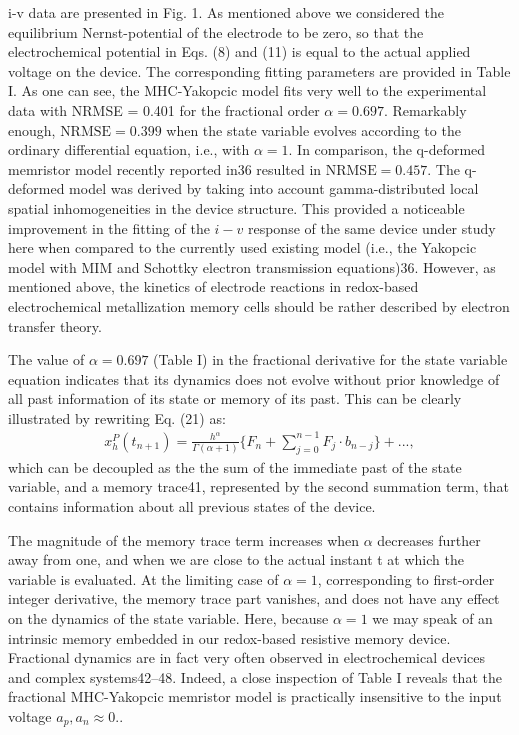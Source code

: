 \documentclass{article}
\begin{document}
{\begin{multicols}{2}
{i-v data are presented in Fig. 1. As mentioned above
we considered the equilibrium Nernst-potential of the
electrode to be zero, so that the electrochemical potential in Eqs. (8) and (11) is equal to the actual applied
voltage on the device. The corresponding fitting parameters are provided in Table I. As one can see, the
MHC-Yakopcic model fits very well to the experimental data with NRMSE = 0.401 for the fractional order
$\alpha = 0.697$. Remarkably enough, $\text{NRMSE} = 0.399$ when
the state variable evolves according to the ordinary differential equation, i.e., with $\alpha = 1$. In comparison, the
q-deformed memristor model recently reported in36 resulted in $\text{NRMSE} = 0.457$. The q-deformed model was
derived by taking into account gamma-distributed local
spatial inhomogeneities in the device structure. This provided a noticeable improvement in the fitting of the $i-v$ response of the same device under study here when
compared to the currently used existing model (i.e., the
Yakopcic model with MIM and Schottky electron transmission equations)36. However, as mentioned above,
the kinetics of electrode reactions in redox-based electrochemical metallization memory cells should be rather described by electron transfer theory. \par
The value of $\alpha = 0.697$ (Table I) in the fractional
derivative for the state variable equation indicates that
its dynamics does not evolve without prior knowledge of
all past information of its state or memory of its past.
This can be clearly illustrated by rewriting Eq. (21) as:
\begin{align}
   x_h^P (t_{n+1}) = \frac{h^\alpha}{\Gamma (\alpha + 1)} \biggl\{ F_n + \sum_{j=0}^{n-1} F_j \cdot b_{n-j} \biggr\} + ...,
\end{align}
which can be decoupled as the the sum of the immediate past of the state variable, and a memory trace41, represented by the second summation term, that contains information about all previous states of the device. \par
The magnitude of the memory trace term increases when $\alpha$ decreases further away from one, and when we are close to the actual instant t at which the variable is evaluated. At the limiting case of $\alpha = 1$, corresponding
to first-order integer derivative, the memory trace part
vanishes, and does not have any effect on the dynamics of
the state variable. Here, because $\alpha = 1$ we may speak of
an intrinsic memory embedded in our redox-based resistive memory device. Fractional dynamics are in fact very often observed in electrochemical devices and complex systems42–48. Indeed, a close inspection of Table I reveals that the fractional MHC-Yakopcic memristor model is practically insensitive to the input voltage $a_p, a_n \approx 0.$.
{\centering %
}}
\end{multicols}}
\end{document}
